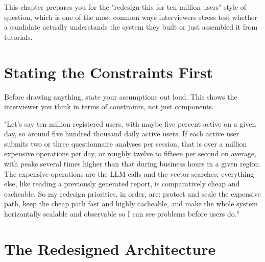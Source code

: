 \documentclass[11pt,a4paper]{report}
\begin{document}
This chapter prepares you for the "redesign this for ten million users" style of question, which is one of the most common ways interviewers stress test whether a candidate actually understands the system they built or just assembled it from tutorials.

\section{Stating the Constraints First}

\begin{notebox}
Before drawing anything, state your assumptions out loud. This shows the interviewer you think in terms of constraints, not just components.

"Let's say ten million registered users, with maybe five percent active on a given day, so around five hundred thousand daily active users. If each active user submits two or three questionnaire analyses per session, that is over a million expensive operations per day, or roughly twelve to fifteen per second on average, with peaks several times higher than that during business hours in a given region. The expensive operations are the LLM calls and the vector searches; everything else, like reading a previously generated report, is comparatively cheap and cacheable. So my redesign priorities, in order, are: protect and scale the expensive path, keep the cheap path fast and highly cacheable, and make the whole system horizontally scalable and observable so I can see problems before users do."
\end{notebox}

\section{The Redesigned Architecture}
\end{document}
